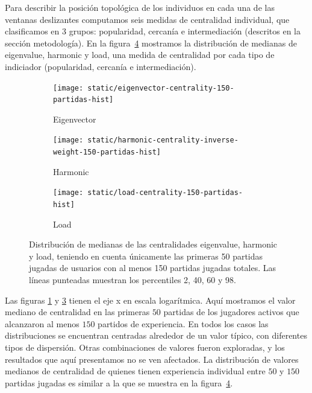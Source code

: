 \documentclass[a4paper,11pt]{book}
\theoremstyle{definition}
\begin{document}
Para describir la posici\'on topol\'ogica de los individuos en cada una de las ventanas deslizantes computamos seis medidas de centralidad individual, que clasificamos en 3 grupos: popularidad, cercan\'ia e intermediaci\'on (descritos en la secci\'on metodolog\'ia).
En la figura~\ref{Figuras.HistogramasCentralidades} mostramos la distribuci\'on de medianas de eigenvalue, harmonic y load, una medida de centralidad por cada tipo de indiciador (popularidad, cercan\'ia e intermediaci\'on).
%
\begin{figure}[ht!]
 	\centering
	 \begin{subfigure}[t]{0.32\textwidth}\centering
	\texttt{[image: static/eigenvector-centrality-150-partidas-hist]}
	\caption{Eigenvector}
	\label{fig:eigenvector-centrality-150-partidas-hist}
	\end{subfigure}
	\begin{subfigure}[t]{0.32\textwidth}\centering
	\texttt{[image: static/harmonic-centrality-inverse-weight-150-partidas-hist]}
	\caption{Harmonic}
	\label{fig:harmonic-centrality-inverse-weight-150-partidas-hist}
	\end{subfigure}
	\begin{subfigure}[t]{0.32\textwidth}\centering
	\texttt{[image: static/load-centrality-150-partidas-hist]}
	\caption{Load}
	\label{fig:load-centrality-150-partidas-hist}
	\end{subfigure}
	\caption{
	Distribuci\'on de medianas de las centralidades eigenvalue, harmonic y load, teniendo en cuenta \'unicamente las primeras 50 partidas jugadas de usuarios con al menos 150 partidas jugadas totales. Las l\'ineas punteadas muestran los percentiles 2, 40, 60 y 98.
	}
	\label{Figuras.HistogramasCentralidades}
 \end{figure}
%
Las figuras \ref{fig:eigenvector-centrality-150-partidas-hist} y \ref{fig:load-centrality-150-partidas-hist} tienen el eje x en escala logar\'itmica.
%
Aqu\'i mostramos el valor mediano de centralidad en las primeras $50$ partidas de los jugadores activos que alcanzaron al menos $150$ partidos de experiencia.
%
En todos los casos las distribuciones se encuentran centradas alrededor de un valor t\'ipico, con diferentes tipos de dispersi\'on.
%
Otras combinaciones de valores fueron exploradas, y los resultados que aqu\'i presentamos no se ven afectados.
%
La distribuci\'on de valores medianos de centralidad de quienes tienen experiencia individual entre $50$ y $150$ partidas jugadas es similar a la que se muestra en la figura~\ref{Figuras.HistogramasCentralidades}.
\end{document}
